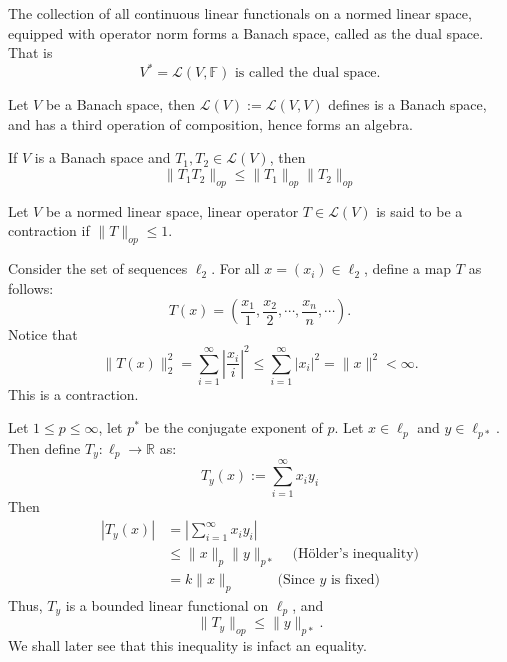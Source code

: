 \vspace{0.4cm}
\begin{definition}
    The collection of all continuous linear functionals on a normed linear space, equipped with operator norm forms a Banach space, called as the dual space. That is $$V^{*}=\mathcal{L}(V,\mathbb{F})\text{ is called the dual space.}$$
\end{definition}
\vspace{0.4cm}
\begin{definition}
    Let $V$ be a Banach space, then $\mathcal{L}(V):=\mathcal{L}(V,V)$ defines is a Banach space, and has a third operation of composition, hence forms an algebra.
\end{definition}
\vspace{0.4cm}
\begin{note}
    If $V$ is a Banach space and $T_{1},T_{2}\in \mathcal{L}(V)$, then $$\|T_{1}T_{2}\|_{op}\leq\|T_{1}\|_{op}\|T_{2}\|_{op}$$
\end{note}
\vspace{0.4cm}
\begin{definition}[Contraction]
    Let $V$ be a normed linear space, linear operator $T\in \mathcal{L}(V)$ is said to be a contraction if $\|T\|_{op}\leq1$.
\end{definition}
\vspace{0.4cm}
\begin{eg}
    Consider the set of sequences $\ell_{2}$. For all $x=(x_{i})\in\ell_{2}$, define a map $T$ as follows: $$T(x)=\left(\frac{x_{1}}{1},\frac{x_{2}}{2},\cdots,\frac{x_{n}}{n},\cdots\right).$$
    Notice that $$\|T(x)\|_{2}^{2}=\sum_{i=1}^{\infty}\left|\frac{x_{i}}{i}\right|^{2}\leq\sum_{i=1}^{\infty}|x_{i}|^{2}=\|x\|^{2}<\infty.$$
    This is a contraction.
\end{eg}
\vspace{0.4cm}
\begin{eg}
Let $1\leq p\leq\infty$, let $p^{*}$ be the conjugate exponent of $p$. Let $x\in\ell_{p}$ and $y\in\ell_{p*}$. Then define $T_{y}:\ell_{p}\to \mathbb{R}$ as:
$$T_{y}(x):=\sum_{i=1}^{\infty}x_{i}y_{i}$$
Then
$$
\begin{aligned}
    |T_{y}(x)|&=\left|\sum_{i=1}^{\infty}x_{i}y_{i}\right|\\
              &\leq\|x\|_{p}\|y\|_{p*}\quad\text{(H\"older's inequality)}\\ 
              &=k\|x\|_{p}\quad\quad\quad\text{(Since $y$ is fixed)}
\end{aligned}
$$
Thus, $T_{y}$ is a bounded linear functional on $\ell_{p}$, and $$\|T_{y}\|_{op}\leq\|y\|_{p*}.$$
We shall later see that this inequality is infact an equality.
\end{eg}
\vspace{0.4cm}


